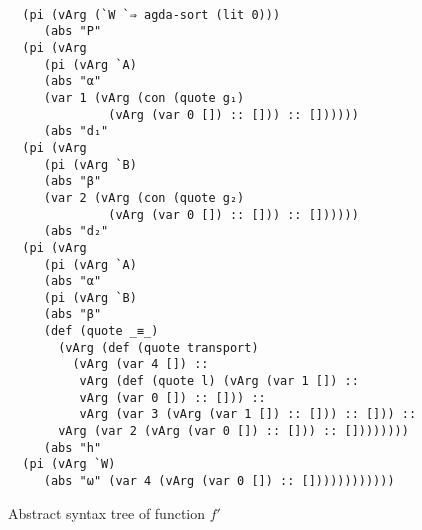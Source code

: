 \documentclass[sigplan,10pt]{acmart}
\begin{document}
\begin{figure}
\begin{center}
\begingroup
\fontsize{7pt}{9pt}\selectfont
\begin{Verbatim}[frame = single]

  (pi (vArg (`W `⇒ agda-sort (lit 0)))
     (abs "P"
  (pi (vArg
     (pi (vArg `A)
     (abs "α"
     (var 1 (vArg (con (quote g₁)
              (vArg (var 0 []) :: [])) :: [])))))
     (abs "d₁"
  (pi (vArg
     (pi (vArg `B)
     (abs "β"
     (var 2 (vArg (con (quote g₂)
              (vArg (var 0 []) :: [])) :: [])))))
     (abs "d₂"
  (pi (vArg
     (pi (vArg `A)
     (abs "α"
     (pi (vArg `B)
     (abs "β"
     (def (quote _≡_)
       (vArg (def (quote transport)
         (vArg (var 4 []) ::
          vArg (def (quote l) (vArg (var 1 []) ::
          vArg (var 0 []) :: [])) ::
          vArg (var 3 (vArg (var 1 []) :: [])) :: [])) ::
       vArg (var 2 (vArg (var 0 []) :: [])) :: [])))))))
     (abs "h"
  (pi (vArg `W)
     (abs "ω" (var 4 (vArg (var 0 []) :: [])))))))))))

\end{Verbatim}
\endgroup
\end{center}
\caption{Abstract syntax tree of function $f'$}
\label{fig:ast-ind-f'}
\end{figure}
\end{document}
